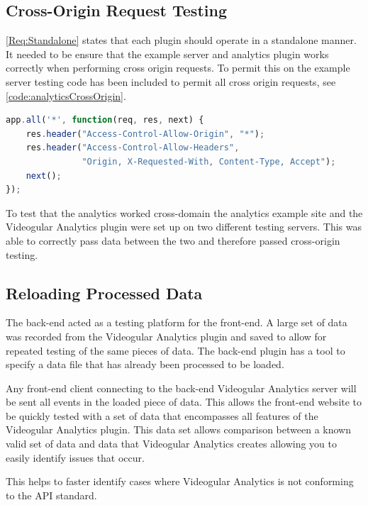 \subsection{Cross-Origin Request Testing}

\cref{Req:Standalone} states that each plugin should operate in a standalone manner. It needed to be ensure that the example server and analytics plugin works correctly when performing cross origin requests. To permit this on the example server testing code has been included to permit all cross origin requests, see \autoref{code:analyticsCrossOrigin}.

\begin{lstlisting}[language=javascript,caption={Code showing appending Cross-Origin headers to all responses}, label={code:analyticsCrossOrigin}]
app.all('*', function(req, res, next) {
	res.header("Access-Control-Allow-Origin", "*");
	res.header("Access-Control-Allow-Headers",
	           "Origin, X-Requested-With, Content-Type, Accept");
	next();
});
\end{lstlisting}

To test that the analytics worked cross-domain the analytics example site and the Videogular Analytics plugin were set up on two different testing servers. This was able to correctly pass data between the two and therefore passed cross-origin testing.

\subsection{Reloading Processed Data}
\label{Section:reloading processed data}

The back-end acted as a testing platform for the front-end. A large set of data was recorded from the Videogular Analytics plugin and saved to allow for repeated testing of the same pieces of data. The back-end plugin has a tool to specify a data file that has already been processed to be loaded.

Any front-end client connecting to the back-end \gls{Videogular} Analytics server will be sent all events in the loaded piece of data. This allows the front-end website to be quickly tested with a set of data that encompasses all features of the \gls{Videogular} Analytics plugin. This data set allows comparison between a known valid set of data and data that \gls{Videogular} Analytics creates allowing you to easily identify issues that occur.

This helps to faster identify cases where \gls{Videogular} Analytics is not conforming to the \gls{API} standard.

